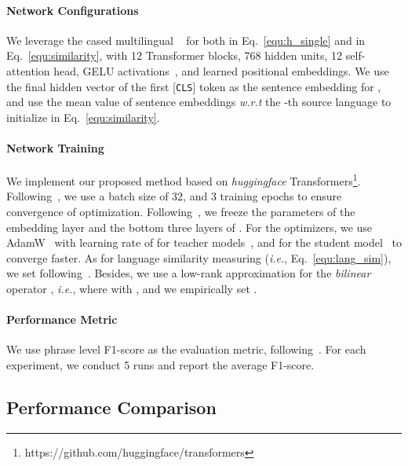 \documentclass[11pt,a4paper]{article}
\newcommand\ie{\textit{i.e.}}
\newcommand\wrt{\textit{w.r.t}}
\begin{document}
	\paragraph{Network Configurations}
	We leverage the cased multilingual ~\cite{wu2019beto} for both  in Eq.~\ref{equ:h_single} and  in Eq.~\ref{equ:similarity}, with 12 Transformer blocks, 768 hidden units, 12 self-attention head, GELU activations~\cite{dan2016bridging}, and learned positional embeddings.
	We use the final hidden vector of the first [\texttt{CLS}] token as the sentence embedding for , and use the mean value of sentence embeddings \wrt{} the -th source language to initialize  in Eq.~\ref{equ:similarity}. 
	
	\paragraph{Network Training}
We implement our proposed method based on \emph{huggingface} Transformers\footnote{https://github.com/huggingface/transformers}. 
	Following~\citet{wolf2019transformers}, we use a batch size of 32, and 3 training epochs to ensure convergence of optimization. Following~\citet{wu2019beto}, we freeze the parameters of the embedding layer and the bottom three layers of . 
	For the optimizers, we use AdamW~\cite{loshchilov2017fixing} with learning rate of  for teacher models~\cite{wolf2019transformers}, and  for the student model~\cite{yang2019model} to converge faster. 
	As for language similarity measuring (\ie, Eq.~\ref{equ:lang_sim}), we set  following~\citet{pinheiro2018unsupervised}. 
	Besides, we use a low-rank approximation for the \textit{bilinear} operator , \ie,  where  with , and we empirically set . 
	
	\paragraph{Performance Metric}
	We use phrase level F1-score as the evaluation metric, following~\citet{tjong2002introduction}. For each experiment, we conduct 5 runs and report the average F1-score. \subsection{Performance Comparison}
	
\end{document}

